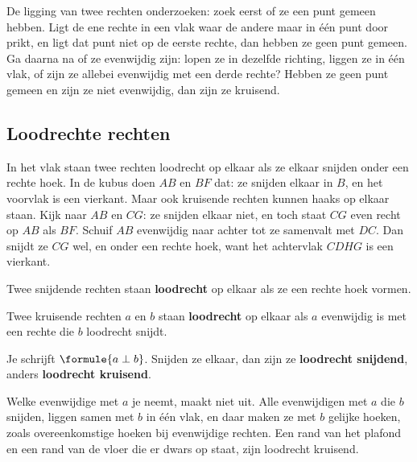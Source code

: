 \begin{werkwijze}
De ligging van twee rechten onderzoeken: zoek eerst of ze een punt gemeen hebben. Ligt de ene rechte in een vlak waar de andere maar in één punt door prikt, en ligt dat punt niet op de eerste rechte, dan hebben ze geen punt gemeen. Ga daarna na of ze evenwijdig zijn: lopen ze in dezelfde richting, liggen ze in één vlak, of zijn ze allebei evenwijdig met een derde rechte? Hebben ze geen punt gemeen en zijn ze niet evenwijdig, dan zijn ze kruisend.
\end{werkwijze}


\begin{oefeningen}
\end{oefeningen}

\subsection{Loodrechte rechten}

In het vlak staan twee rechten loodrecht op elkaar als ze elkaar snijden onder een rechte hoek. In de kubus doen $AB$ en $BF$ dat: ze snijden elkaar in $B$, en het voorvlak is een vierkant. Maar ook kruisende rechten kunnen haaks op elkaar staan. Kijk naar $AB$ en $CG$: ze snijden elkaar niet, en toch staat $CG$ even recht op $AB$ als $BF$. Schuif $AB$ evenwijdig naar achter tot ze samenvalt met $DC$. Dan snijdt ze $CG$ wel, en onder een rechte hoek, want het achtervlak $CDHG$ is een vierkant.

\begin{theorie}
Twee snijdende rechten staan \textbf{\textcolor{accent}{loodrecht}} op elkaar als ze een rechte hoek vormen.

Twee kruisende rechten $a$ en $b$ staan \textbf{\textcolor{accent}{loodrecht}} op elkaar als $a$ evenwijdig is met een rechte die $b$ loodrecht snijdt.

Je schrijft $\formule{a \perp b}$. Snijden ze elkaar, dan zijn ze \textbf{\textcolor{accent}{loodrecht snijdend}}, anders \textbf{\textcolor{accent}{loodrecht kruisend}}.
\end{theorie}

Welke evenwijdige met $a$ je neemt, maakt niet uit. Alle evenwijdigen met $a$ die $b$ snijden, liggen samen met $b$ in één vlak, en daar maken ze met $b$ gelijke hoeken, zoals overeenkomstige hoeken bij evenwijdige rechten. Een rand van het plafond en een rand van de vloer die er dwars op staat, zijn loodrecht kruisend.

